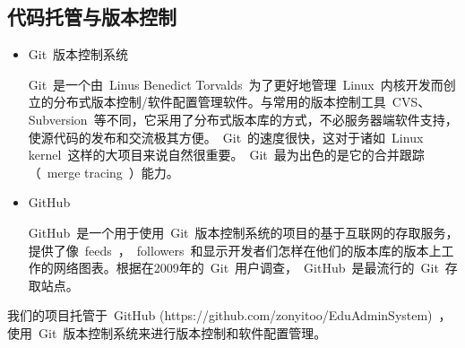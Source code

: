 \subsection{代码托管与版本控制}
\begin{itemize}
  \item Git~版本控制系统
  
  \CJKindent Git~是一个由~Linus Benedict Torvalds~为了更好地管理~Linux~内核开发而创立的分布式版本控制/软件配置管理软件。与常用的版本控制工具~CVS、Subversion~等不同，它采用了分布式版本库的方式，不必服务器端软件支持，使源代码的发布和交流极其方便。~Git~的速度很快，这对于诸如~Linux kernel~这样的大项目来说自然很重要。~Git~最为出色的是它的合并跟踪（~merge tracing~）能力。
  
  \item GitHub
  
  \CJKindent GitHub~是一个用于使用~Git~版本控制系统的项目的基于互联网的存取服务，提供了像~feeds~，~followers~和显示开发者们怎样在他们的版本库的版本上工作的网络图表。根据在2009年的~Git~用户调查，~GitHub~是最流行的~Git~存取站点。
\end{itemize}

我们的项目托管于~GitHub (https://github.com/zonyitoo/EduAdminSystem)~，使用~Git~版本控制系统来进行版本控制和软件配置管理。
